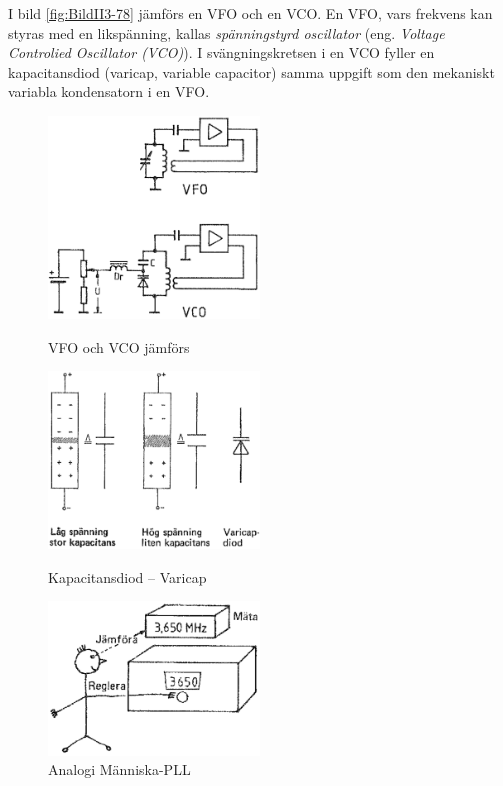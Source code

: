 I bild \ref{fig:BildII3-78} jämförs en VFO och en VCO.
En VFO, vars frekvens kan styras med en likspänning, kallas
\emph{spänningstyrd oscillator} (eng. \emph{Voltage Controlied Oscillator
  (VCO)}).
I svängningskretsen i en VCO fyller en kapacitansdiod (varicap, variable
capacitor) samma uppgift som den mekaniskt variabla kondensatorn i en VFO.

\begin{figure}
  \includegraphics[width=0.5\textwidth]{images/cropped_pdfs/bild_2_3-78.pdf}
  \caption{VFO och VCO jämförs}
  \label{fig:BildII3-78}

  \includegraphics[width=0.5\textwidth]{images/cropped_pdfs/bild_2_3-79.pdf}
  \caption{Kapacitansdiod -- Varicap}
  \label{fig:BildII3-79}

  \includegraphics[width=0.5\textwidth]{images/cropped_pdfs/bild_2_3-80a.pdf}
  \caption{Analogi Människa-PLL}
  \label{fig:BildII3-80a}
\end{figure}

